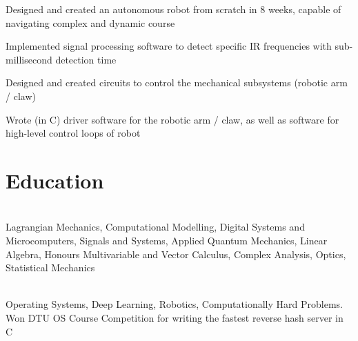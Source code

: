 \documentclass[]{deedy-resume-openfont}
\begin{document}
\begin{tightemize}
    \item Designed and created an autonomous robot from scratch in 8 weeks, capable of navigating complex and dynamic course
    \item Implemented signal processing software to detect specific IR frequencies with sub-millisecond detection time
    \item Designed and created circuits to control the mechanical subsystems (robotic arm / claw)
    \item Wrote (in C) driver software for the robotic arm / claw, as well as software for high-level control loops of robot
\end{tightemize}

\vspace{12pt}


\section{Education}

\begin{adjustwidth}{0.55cm}{1.25cm}
	 \\
	 Lagrangian Mechanics, Computational Modelling, Digital Systems and Microcomputers, Signals and Systems, Applied Quantum Mechanics, Linear Algebra, Honours Multivariable and Vector Calculus, Complex Analysis, Optics, Statistical Mechanics
\end{adjustwidth}

\vspace{8pt}

\begin{adjustwidth}{0.55cm}{1.25cm}
	 \\
   Operating Systems, Deep Learning, Robotics, Computationally Hard Problems. \\
	Won DTU OS Course Competition for writing the fastest reverse hash server in C
\end{adjustwidth}

\vspace{10pt}
\end{document}
